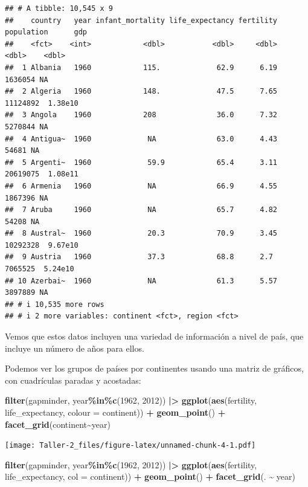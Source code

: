 \documentclass[
]{article}
\newenvironment{Shaded}{\begin{snugshade}}{\end{snugshade}}
\newcommand{\AttributeTok}[1]{\textcolor[rgb]{0.13,0.29,0.53}{#1}}
\newcommand{\DecValTok}[1]{\textcolor[rgb]{0.00,0.00,0.81}{#1}}
\newcommand{\FunctionTok}[1]{\textcolor[rgb]{0.13,0.29,0.53}{\textbf{#1}}}
\newcommand{\NormalTok}[1]{#1}
\newcommand{\SpecialCharTok}[1]{\textcolor[rgb]{0.81,0.36,0.00}{\textbf{#1}}}
\begin{document}
\begin{verbatim}
## # A tibble: 10,545 x 9
##    country   year infant_mortality life_expectancy fertility population      gdp
##    <fct>    <int>            <dbl>           <dbl>     <dbl>      <dbl>    <dbl>
##  1 Albania   1960            115.             62.9      6.19    1636054 NA      
##  2 Algeria   1960            148.             47.5      7.65   11124892  1.38e10
##  3 Angola    1960            208              36.0      7.32    5270844 NA      
##  4 Antigua~  1960             NA              63.0      4.43      54681 NA      
##  5 Argenti~  1960             59.9            65.4      3.11   20619075  1.08e11
##  6 Armenia   1960             NA              66.9      4.55    1867396 NA      
##  7 Aruba     1960             NA              65.7      4.82      54208 NA      
##  8 Austral~  1960             20.3            70.9      3.45   10292328  9.67e10
##  9 Austria   1960             37.3            68.8      2.7     7065525  5.24e10
## 10 Azerbai~  1960             NA              61.3      5.57    3897889 NA      
## # i 10,535 more rows
## # i 2 more variables: continent <fct>, region <fct>
\end{verbatim}

Vemos que estos datos incluyen una variedad de información a nivel de
país, que incluye un número de años para ellos.

Podemos ver los grupos de países por continentes usando una matriz de
gráficos, con cuadrículas paradas y acostadas:

\begin{Shaded}
\begin{Highlighting}[]
\FunctionTok{filter}\NormalTok{(gapminder, year}\SpecialCharTok{\%in\%}\FunctionTok{c}\NormalTok{(}\DecValTok{1962}\NormalTok{, }\DecValTok{2012}\NormalTok{)) }\SpecialCharTok{|\textgreater{}}
  \FunctionTok{ggplot}\NormalTok{(}\FunctionTok{aes}\NormalTok{(fertility, life\_expectancy, }\AttributeTok{colour =}\NormalTok{ continent)) }\SpecialCharTok{+}
  \FunctionTok{geom\_point}\NormalTok{() }\SpecialCharTok{+}
  \FunctionTok{facet\_grid}\NormalTok{(continent}\SpecialCharTok{\textasciitilde{}}\NormalTok{year)}
\end{Highlighting}
\end{Shaded}

\texttt{[image: Taller-2\_files/figure-latex/unnamed-chunk-4-1.pdf]}

\begin{Shaded}
\begin{Highlighting}[]
\FunctionTok{filter}\NormalTok{(gapminder, year}\SpecialCharTok{\%in\%}\FunctionTok{c}\NormalTok{(}\DecValTok{1962}\NormalTok{, }\DecValTok{2012}\NormalTok{)) }\SpecialCharTok{|\textgreater{}}
  \FunctionTok{ggplot}\NormalTok{(}\FunctionTok{aes}\NormalTok{(fertility, life\_expectancy, }\AttributeTok{col =}\NormalTok{ continent)) }\SpecialCharTok{+}
  \FunctionTok{geom\_point}\NormalTok{() }\SpecialCharTok{+}
  \FunctionTok{facet\_grid}\NormalTok{(. }\SpecialCharTok{\textasciitilde{}}\NormalTok{ year)}
\end{Highlighting}
\end{Shaded}
\end{document}
